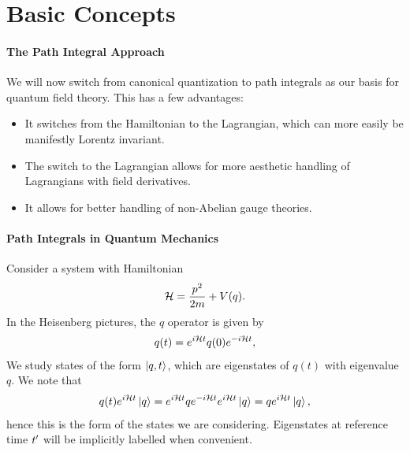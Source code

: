 \section{Basic Concepts}

\paragraph{The Path Integral Approach}
We will now switch from canonical quantization to path integrals as our basis for quantum field theory. This has a few advantages:
\begin{itemize}
	\item It switches from the Hamiltonian to the Lagrangian, which can more easily be manifestly Lorentz invariant.
	\item The switch to the Lagrangian allows for more aesthetic handling of Lagrangians with field derivatives.
	\item It allows for better handling of non-Abelian gauge theories.
\end{itemize}

\paragraph{Path Integrals in Quantum Mechanics}
Consider a system with Hamiltonian
\begin{align*}
	\mathcal{H} = \frac{p^{2}}{2m} + V(q).
\end{align*}
In the Heisenberg pictures, the $q$ operator is given by
\begin{align*}
	q(t) = e^{i\mathcal{H} t}q(0)e^{-i\mathcal{H} t},
\end{align*}
We study states of the form $\ket{q, t}$, which are eigenstates of $q(t)$ with eigenvalue $q$. We note that
\begin{align*}
	q(t)e^{i\mathcal{H} t}\ket{q} = e^{i\mathcal{H} t}qe^{-i\mathcal{H} t}e^{i\mathcal{H} t}\ket{q} = qe^{i\mathcal{H} t}\ket{q},
\end{align*}
hence this is the form of the states we are considering. Eigenstates at reference time $t^{\prime}$ will be implicitly labelled when convenient.


